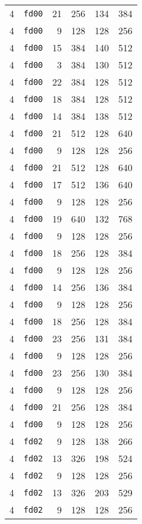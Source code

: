 \documentclass{article}
\begin{document}
\begin{table}[h!]
\begin{tabular}{llrrrl}
    4 & \texttt{fd00} & 21 & 256 & 134 & 384 \\
    4 & \texttt{fd00} & 9 & 128 & 128 & 256 \\
    4 & \texttt{fd00} & 15 & 384 & 140 & 512 \\
    4 & \texttt{fd00} & 3 & 384 & 130 & 512 \\
    4 & \texttt{fd00} & 22 & 384 & 128 & 512 \\
    4 & \texttt{fd00} & 18 & 384 & 128 & 512 \\
    4 & \texttt{fd00} & 14 & 384 & 138 & 512 \\
    4 & \texttt{fd00} & 21 & 512 & 128 & 640 \\
    4 & \texttt{fd00} & 9 & 128 & 128 & 256 \\
    4 & \texttt{fd00} & 21 & 512 & 128 & 640 \\
    4 & \texttt{fd00} & 17 & 512 & 136 & 640 \\
    4 & \texttt{fd00} & 9 & 128 & 128 & 256 \\
    4 & \texttt{fd00} & 19 & 640 & 132 & 768 \\
    4 & \texttt{fd00} & 9 & 128 & 128 & 256 \\
    4 & \texttt{fd00} & 18 & 256 & 128 & 384 \\
    4 & \texttt{fd00} & 9 & 128 & 128 & 256 \\
    4 & \texttt{fd00} & 14 & 256 & 136 & 384 \\
    4 & \texttt{fd00} & 9 & 128 & 128 & 256 \\
    4 & \texttt{fd00} & 18 & 256 & 128 & 384 \\
    4 & \texttt{fd00} & 23 & 256 & 131 & 384 \\
    4 & \texttt{fd00} & 9 & 128 & 128 & 256 \\
    4 & \texttt{fd00} & 23 & 256 & 130 & 384 \\
    4 & \texttt{fd00} & 9 & 128 & 128 & 256 \\
    4 & \texttt{fd00} & 21 & 256 & 128 & 384 \\
    4 & \texttt{fd00} & 9 & 128 & 128 & 256 \\
    4 & \texttt{fd02} & 9 & 128 & 138 & 266 \\
    4 & \texttt{fd02} & 13 & 326 & 198 & 524 \\
    4 & \texttt{fd02} & 9 & 128 & 128 & 256 \\
    4 & \texttt{fd02} & 13 & 326 & 203 & 529 \\
    4 & \texttt{fd02} & 9 & 128 & 128 & 256 \\

\end{tabular}
\end{table}
\end{document}

